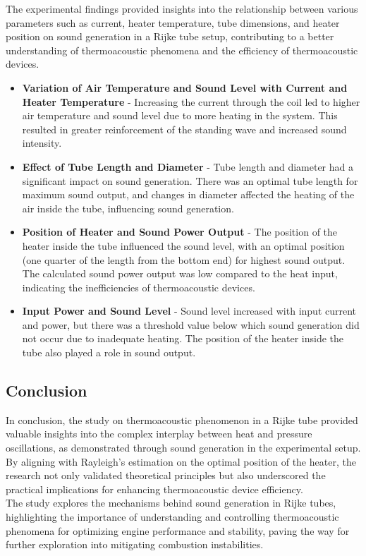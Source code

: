 \documentclass[8pt]{article} %
\begin{document}
The experimental findings provided insights into the relationship between various parameters such as current, heater temperature, tube dimensions, and heater position on sound generation in a Rijke tube setup, contributing to a better understanding of thermoacoustic phenomena and the efficiency of thermoacoustic devices.\cite{Rijke Tube Paper}
\begin{itemize}
\item \textbf{Variation of Air Temperature and Sound Level with Current and Heater Temperature} - Increasing the current through the coil led to higher air temperature and sound level due to more heating in the system. This resulted in greater reinforcement of the standing wave and increased sound intensity.
\item \textbf{Effect of Tube Length and Diameter} - Tube length and diameter had a significant impact on sound generation. There was an optimal tube length for maximum sound output, and changes in diameter affected the heating of the air inside the tube, influencing sound generation.
\item \textbf{Position of Heater and Sound Power Output} - The position of the heater inside the tube influenced the sound level, with an optimal position (one quarter of the length from the bottom end) for highest sound output. The calculated sound power output was low compared to the heat input, indicating the inefficiencies of thermoacoustic devices.
\item \textbf{Input Power and Sound Level} - Sound level increased with input current and power, but there was a threshold value below which sound generation did not occur due to inadequate heating. The position of the heater inside the tube also played a role in sound output.
\end{itemize}

\subsection{Conclusion}
In conclusion, the study on thermoacoustic phenomenon in a Rijke tube provided valuable insights into the complex interplay between heat and pressure oscillations, as demonstrated through sound generation in the experimental setup. By aligning with Rayleigh's estimation on the optimal position of the heater, the research not only validated theoretical principles but also underscored the practical implications for enhancing thermoacoustic device efficiency.\\
The study explores the mechanisms behind sound generation in Rijke tubes, highlighting the importance of understanding and controlling thermoacoustic phenomena for optimizing engine performance and stability, paving the way for further exploration into mitigating combustion instabilities.
\end{document}
